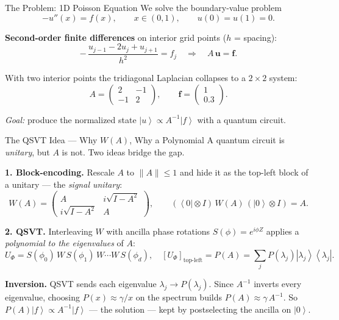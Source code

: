 \documentclass[10pt,aspectratio=169]{beamer}
\newcommand{\ket}[1]{\left|#1\right\rangle}
\newcommand{\bra}[1]{\left\langle#1\right|}
\begin{document}
\begin{frame}{The Problem: 1D Poisson Equation}
  We solve the boundary-value problem
  \[
    -u''(x) = f(x), \qquad x \in (0,1), \qquad u(0)=u(1)=0.
  \]

  \pause
  \textbf{Second-order finite differences} on interior grid points ($h$ = spacing):
  \[
    -\,\frac{u_{j-1} - 2u_j + u_{j+1}}{h^2} = f_j
    \quad\Longrightarrow\quad A\,\bm{u} = \bm{f}.
  \]

  \pause
  With two interior points the tridiagonal Laplacian collapses to a $2\times 2$ system:
  \[
    A =
    \begin{pmatrix} 2 & -1 \\ -1 & 2 \end{pmatrix},
    \qquad
    \bm{f} = \begin{pmatrix} 1 \\ 0.3 \end{pmatrix}.
  \]

  \centering
  \emph{Goal:} produce the normalized state $\ket{u} \propto A^{-1}\ket{f}$ with a quantum circuit.
\end{frame}

\begin{frame}{The QSVT Idea --- Why $W(A)$, Why a Polynomial}
  A quantum circuit is \emph{unitary}, but $A$ is not. Two ideas bridge the gap.

  \textbf{1. Block-encoding.} Rescale $A$ to $\|A\|\le 1$ and hide it as the top-left block of a
  unitary --- the \emph{signal unitary}:
  \[
    W(A)=\begin{pmatrix} A & i\sqrt{I-A^2}\\[2pt] i\sqrt{I-A^2} & A\end{pmatrix},
    \qquad (\bra{0}\!\otimes\! I)\,W(A)\,(\ket{0}\!\otimes\! I)=A.
  \]

  \pause
  \textbf{2. QSVT.} Interleaving $W$ with ancilla phase rotations $S(\phi)=e^{i\phi Z}$ applies a
  \emph{polynomial to the eigenvalues} of $A$:
  \[
    U_\Phi=S(\phi_0)\,W\,S(\phi_1)\,W\cdots W\,S(\phi_d),
    \quad
    [U_\Phi]_{\text{top-left}}=P(A)=\sum_j P(\lambda_j)\ket{\lambda_j}\!\bra{\lambda_j}.
  \]

  \pause
  \textbf{Inversion.} QSVT sends each eigenvalue $\lambda_j \to P(\lambda_j)$. Since $A^{-1}$ inverts
  every eigenvalue, choosing $P(x)\approx \gamma/x$ on the spectrum builds $P(A)\approx \gamma\,A^{-1}$.
  So $P(A)\ket{f}\propto A^{-1}\ket{f}$ --- the solution --- kept by postselecting the ancilla on $\ket{0}$.
\end{frame}
\end{document}
